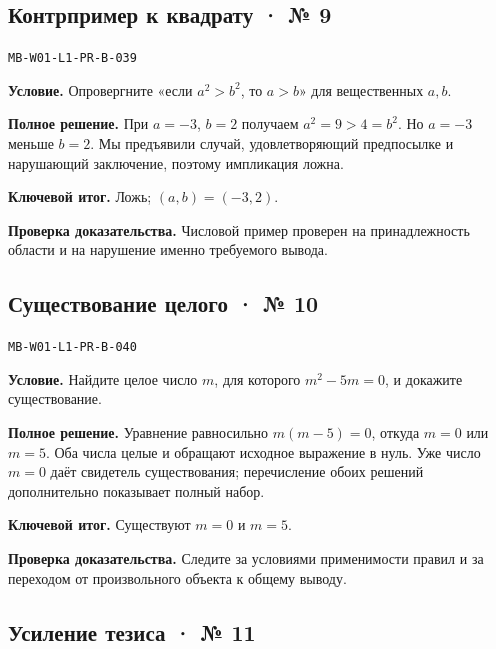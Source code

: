 \documentclass[11pt,a4paper,openany]{book}
\newcommand{\muid}[1]{\texttt{\footnotesize #1}}
\begin{document}
\subsection*{Контрпример к квадрату · № 9}\hypertarget{solution:MB-W01-L1-PR-B-039}{}

\muid{MB-W01-L1-PR-B-039}\par

\textbf{Условие.} Опровергните «если $a^2>b^2$, то $a>b$» для вещественных $a,b$.\par

\textbf{Полное решение.} При $a=-3$, $b=2$ получаем $a^2=9>4=b^2$. Но $a=-3$ меньше $b=2$. Мы предъявили случай, удовлетворяющий предпосылке и нарушающий заключение, поэтому импликация ложна.


\begin{learnbox}\textbf{Ключевой итог.} Ложь; $(a,b)=(-3,2)$.\par \textbf{Проверка доказательства.} 
Числовой пример проверен на принадлежность области и на нарушение именно требуемого вывода. 
\end{learnbox}

\subsection*{Существование целого · № 10}\hypertarget{solution:MB-W01-L1-PR-B-040}{}

\muid{MB-W01-L1-PR-B-040}\par

\textbf{Условие.} Найдите целое число $m$, для которого $m^2-5m=0$, и докажите существование.\par

\textbf{Полное решение.} Уравнение равносильно $m(m-5)=0$, откуда $m=0$ или $m=5$. Оба числа целые и обращают исходное выражение в нуль. Уже число $m=0$ даёт свидетель существования; перечисление обоих решений дополнительно показывает полный набор.


\begin{learnbox}\textbf{Ключевой итог.} Существуют $m=0$ и $m=5$.\par \textbf{Проверка доказательства.} 
Следите за условиями применимости правил и за переходом от произвольного объекта к общему выводу. 
\end{learnbox}

\subsection*{Усиление тезиса · № 11}\hypertarget{solution:MB-W01-L1-PR-B-041}{}
\end{document}
